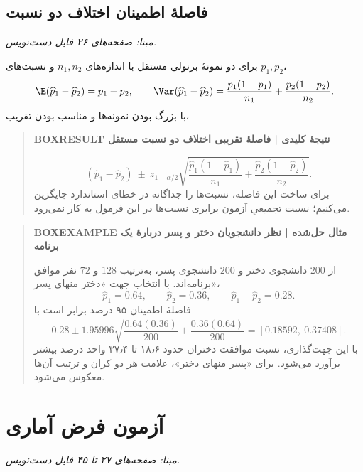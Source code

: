 \section{فاصلهٔ اطمینان اختلاف دو نسبت}
\textit{مبنا: صفحه‌های ۲۶ فایل دست‌نویس.}\par 
برای دو نمونهٔ برنولی مستقل با اندازه‌های $n_1,n_2$ و نسبت‌های $p_1,p_2$،
\[
\E(\widehat p_1-\widehat p_2)=p_1-p_2,
\qquad
\Var(\widehat p_1-\widehat p_2)=\frac{p_1(1-p_1)}{n_1}+\frac{p_2(1-p_2)}{n_2}.
\]
با بزرگ بودن نمونه‌ها و مناسب بودن تقریب،
\begin{quote}\textbf{BOXRESULT نتیجهٔ کلیدی | فاصلهٔ تقریبی اختلاف دو نسبت مستقل}\par 
\[
\boxed{(\widehat p_1-\widehat p_2)\ \pm\ z_{1-\alpha/2}
\sqrt{\frac{\widehat p_1(1-\widehat p_1)}{n_1}
+\frac{\widehat p_2(1-\widehat p_2)}{n_2}}.}
\]
برای ساخت این فاصله، نسبت‌ها را جداگانه در خطای استاندارد جایگزین می‌کنیم؛ نسبت تجمیعیِ آزمون برابری نسبت‌ها در این فرمول به کار نمی‌رود.
\end{quote}
\begin{quote}\textbf{BOXEXAMPLE مثال حل‌شده | نظر دانشجویان دختر و پسر دربارهٔ یک برنامه}\par 
از $200$ دانشجوی دختر و $200$ دانشجوی پسر، به‌ترتیب $128$ و $72$ نفر موافق برنامه‌اند. با انتخاب جهت «دختر منهای پسر»،
\[
\widehat p_1=0.64,\qquad\widehat p_2=0.36,\qquad
\widehat p_1-\widehat p_2=0.28.
\]
فاصلهٔ اطمینان ۹۵ درصد برابر است با
\[
0.28\pm1.95996\sqrt{\frac{0.64(0.36)}{200}+\frac{0.36(0.64)}{200}}
=\boxed{[0.18592,\ 0.37408]}.
\]
با این جهت‌گذاری، نسبت موافقت دختران حدود ۱۸٫۶ تا ۳۷٫۴ واحد درصد بیشتر برآورد می‌شود. برای «پسر منهای دختر»، علامت هر دو کران و ترتیب آن‌ها معکوس می‌شود.
\end{quote}

\chapter{آزمون فرض آماری}
\textit{مبنا: صفحه‌های ۲۷ تا ۴۵ فایل دست‌نویس.}\par 

